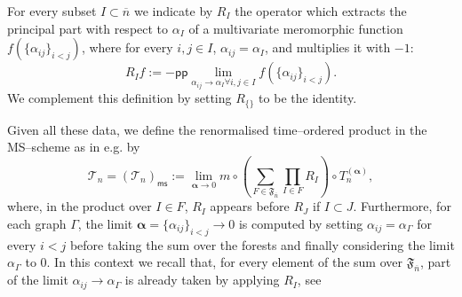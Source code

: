 \documentclass[10pt]{book}
\newcommand{\pp}{\mathsf{pp}}
\newcommand{\ms}{\mathsf{ms}}
\theoremstyle{break}
\begin{document}

For every subset $I\subset \overline{n}$ we indicate by $R_I$ the operator which extracts the principal part with respect to $\alpha_I$ of a multivariate meromorphic function $f(\{\alpha_{ij}\}_{i<j})$, where for every $i,j \in I$, $\alpha_{ij}=\alpha_I$, and multiplies it with $-1$:
\begin{equation}
R_I f := - \pp  \lim_{\scriptstyle\alpha_{ij} \to \alpha_I \forall i,j\in I} f(\{\alpha_{ij}\}_{i<j}).
\end{equation}
We complement this definition by setting $R_{\{\}}$ to be the identity.

Given all these data, we define the renormalised time--ordered product in the MS--scheme as in e.g. %
by
\begin{equation}
\mathcal{T}_n = \left(\mathcal{T}_n\right)_\ms := \lim_{\boldsymbol{\alpha} \to 0}   m \circ   \left( \sum_{F\in\mathfrak{F}_{\overline{n}}} \prod_{I\in F} R_I\right)  \circ    T^{(\boldsymbol{\alpha})}_n,
\end{equation}
where, in the product over $I\in F$, $R_I$ appears before $R_J$ if $I\subset J$. 
Furthermore, for each graph $\Gamma$, the limit $\boldsymbol{\alpha}=\{\alpha_{ij}\}_{i<j}\to 0$ is computed by setting $\alpha_{ij}= \alpha_\Gamma$ for every $i<j$ before taking the sum over the forests and finally considering the limit $\alpha_\Gamma$ to $0$. In this context we recall that, for every element of the sum over $\mathfrak{F}_{\overline{n}}$, part of the limit $\alpha_{ij}\to \alpha_\Gamma$ is already taken by applying $R_I$, see %
\end{document}
